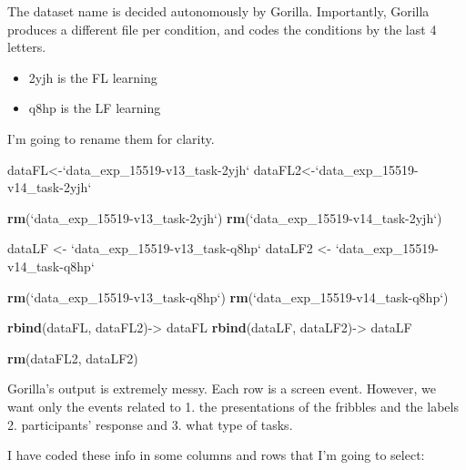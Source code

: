 \documentclass[
]{article}
\newenvironment{Shaded}{\begin{snugshade}}{\end{snugshade}}
\newcommand{\DataTypeTok}[1]{\textcolor[rgb]{0.13,0.29,0.53}{#1}}
\newcommand{\KeywordTok}[1]{\textcolor[rgb]{0.13,0.29,0.53}{\textbf{#1}}}
\newcommand{\NormalTok}[1]{#1}
\newcommand{\StringTok}[1]{\textcolor[rgb]{0.31,0.60,0.02}{#1}}
\begin{document}
The dataset name is decided autonomously by Gorilla. Importantly,
Gorilla produces a different file per condition, and codes the
conditions by the last 4 letters.

\begin{itemize}
\item
  2yjh is the FL learning
\item
  q8hp is the LF learning
\end{itemize}

I'm going to rename them for clarity.

\begin{Shaded}
\begin{Highlighting}[]
\NormalTok{dataFL<-}\StringTok{`}\DataTypeTok{data_exp_15519-v13_task-2yjh}\StringTok{`}
\NormalTok{dataFL2<-}\StringTok{`}\DataTypeTok{data_exp_15519-v14_task-2yjh}\StringTok{`}

\KeywordTok{rm}\NormalTok{(}\StringTok{`}\DataTypeTok{data_exp_15519-v13_task-2yjh}\StringTok{`}\NormalTok{)}
\KeywordTok{rm}\NormalTok{(}\StringTok{`}\DataTypeTok{data_exp_15519-v14_task-2yjh}\StringTok{`}\NormalTok{)}

\NormalTok{dataLF <-}\StringTok{ `}\DataTypeTok{data_exp_15519-v13_task-q8hp}\StringTok{`}
\NormalTok{dataLF2 <-}\StringTok{ `}\DataTypeTok{data_exp_15519-v14_task-q8hp}\StringTok{`}

\KeywordTok{rm}\NormalTok{(}\StringTok{`}\DataTypeTok{data_exp_15519-v13_task-q8hp}\StringTok{`}\NormalTok{)}
\KeywordTok{rm}\NormalTok{(}\StringTok{`}\DataTypeTok{data_exp_15519-v14_task-q8hp}\StringTok{`}\NormalTok{)}
\end{Highlighting}
\end{Shaded}

\begin{Shaded}
\begin{Highlighting}[]
\KeywordTok{rbind}\NormalTok{(dataFL, dataFL2)->}\StringTok{ }\NormalTok{dataFL}
\KeywordTok{rbind}\NormalTok{(dataLF, dataLF2)->}\StringTok{ }\NormalTok{dataLF}

\KeywordTok{rm}\NormalTok{(dataFL2, dataLF2)}
\end{Highlighting}
\end{Shaded}

Gorilla's output is extremely messy. Each row is a screen event.
However, we want only the events related to 1. the presentations of the
fribbles and the labels 2. participants' response and 3. what type of
tasks.

I have coded these info in some columns and rows that I'm going to
select:
\end{document}
